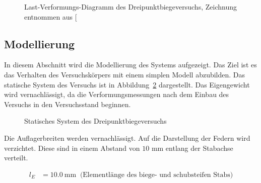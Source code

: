 \documentclass[
  11pt,
  letterpaper,
]{scrreprt}
\begin{document}
\begin{figure}[H]


\caption{\label{fig-last_verformung_a3v2}Last-Verformungs-Diagramm des
Dreipunktbiegeversuchs, Zeichnung entnommen aus
{[}\citeproc{ref-jager_versuche_2006}{2}{]}}

\end{figure}%

\subsection{Modellierung}\label{modellierung}

In diesem Abschnitt wird die Modellierung des Systems aufgezeigt. Das
Ziel ist es das Verhalten des Versuchskörpers mit einem simplen Modell
abzubilden. Das statische System des Versuchs ist in
Abbildung~\ref{fig-system_a3v2} dargestellt. Das Eigengewicht wird
vernachlässigt, da die Verformungsmessungen nach dem Einbau des Versuchs
in den Versuchsstand beginnen.

\begin{figure}[H]


\caption{\label{fig-system_a3v2}Statisches System des
Dreipunktbiegeversuchs}

\end{figure}%

Die Auflagerbreiten werden vernachlässigt. Auf die Darstellung der
Federn wird verzichtet. Diese sind in einem Abstand von \(10\) mm
entlang der Stabachse verteilt.

$$
\begin{aligned}
l_{E} &= 10.0\ \mathrm{mm} \; \;\textrm{(Elementlänge des biege- und schubsteifen Stabs)}
\end{aligned}
$$
\end{document}

